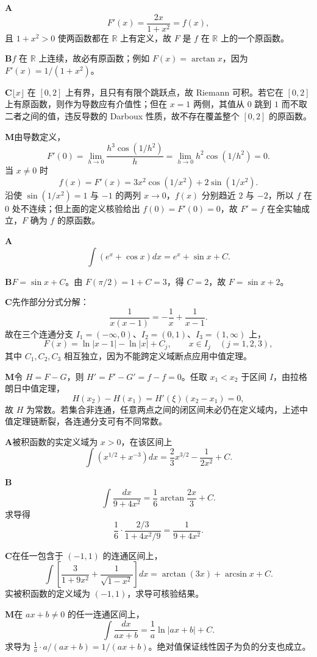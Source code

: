 \begin{solutionBox}
\textbf{A}\quad
\[
F'(x)=\frac{2x}{1+x^2}=f(x),
\]
且 \(1+x^2>0\) 使两函数都在 \(\mathbb R\) 上有定义，故 \(F\) 是 \(f\) 在 \(\mathbb R\) 上的一个原函数。

\textbf{B}\quad \(f\) 在 \(\mathbb R\) 上连续，故必有原函数；例如 \(F(x)=\arctan x\)，因为 \(F'(x)=1/(1+x^2)\)。

\textbf{C}\quad \(\lfloor x\rfloor\) 在 \([0,2]\) 上有界，且只有有限个跳跃点，故 Riemann 可积。若它在 \([0,2]\) 上有原函数，则作为导数应有介值性；但在 \(x=1\) 两侧，其值从 \(0\) 跳到 \(1\) 而不取二者之间的值，违反导数的 Darboux 性质，故不存在覆盖整个 \([0,2]\) 的原函数。

\textbf{M}\quad 由导数定义，
\[
F'(0)=\lim_{h\to0}\frac{h^3\cos(1/h^2)}h
=\lim_{h\to0}h^2\cos(1/h^2)=0.
\]
当 \(x\ne0\) 时
\[
f(x)=F'(x)=3x^2\cos(1/x^2)+2\sin(1/x^2).
\]
沿使 \(\sin(1/x^2)=1\) 与 \(-1\) 的两列 \(x\to0\)，\(f(x)\) 分别趋近 \(2\) 与 \(-2\)，所以 \(f\) 在 \(0\) 处不连续；但上面的定义核验给出 \(f(0)=F'(0)=0\)，故 \(F'=f\) 在全实轴成立，\(F\) 确为 \(f\) 的原函数。
\end{solutionBox}

\begin{solutionBox}
\textbf{A}\quad
\[
\int(e^x+\cos x)dx=e^x+\sin x+C.
\]

\textbf{B}\quad \(F=\sin x+C\)。由 \(F(\pi/2)=1+C=3\)，得 \(C=2\)，故 \(F=\sin x+2\)。

\textbf{C}\quad 先作部分分式分解：
\[
\frac1{x(x-1)}=-\frac1x+\frac1{x-1}.
\]
故在三个连通分支 \(I_1=(-\infty,0)\)、\(I_2=(0,1)\)、\(I_3=(1,\infty)\) 上，
\[
F(x)=\ln|x-1|-\ln|x|+C_j,\qquad x\in I_j\quad(j=1,2,3),
\]
其中 \(C_1,C_2,C_3\) 相互独立，因为不能跨定义域断点应用中值定理。

\textbf{M}\quad 令 \(H=F-G\)，则 \(H'=F'-G'=f-f=0\)。任取 \(x_1<x_2\) 于区间 \(I\)，由拉格朗日中值定理，
\[
H(x_2)-H(x_1)=H'(\xi)(x_2-x_1)=0,
\]
故 \(H\) 为常数。若集合非连通，任意两点之间的闭区间未必仍在定义域内，上述中值定理链断裂，各连通分支可有不同常数。
\end{solutionBox}

\begin{solutionBox}
\textbf{A}\quad 被积函数的实定义域为 \(x>0\)，在该区间上
\[
\int(x^{1/2}+x^{-3})dx
=\frac23x^{3/2}-\frac1{2x^2}+C.
\]

\textbf{B}\quad
\[
\int\frac{dx}{9+4x^2}
=\frac16\arctan\frac{2x}{3}+C.
\]
求导得
\[
\frac16\cdot\frac{2/3}{1+4x^2/9}
=\frac1{9+4x^2}.
\]

\textbf{C}\quad 在任一包含于 \((-1,1)\) 的连通区间上，
\[
\int\left[\frac3{1+9x^2}+\frac1{\sqrt{1-x^2}}\right]dx
=\arctan(3x)+\arcsin x+C.
\]
实被积函数的定义域为 \((-1,1)\)，求导可核验结果。

\textbf{M}\quad 在 \(ax+b\ne0\) 的任一连通区间上，
\[
\int\frac{dx}{ax+b}=\frac1a\ln|ax+b|+C.
\]
求导为 \(\frac1a\cdot a/(ax+b)=1/(ax+b)\)。绝对值保证线性因子为负的分支也成立。
\end{solutionBox}

